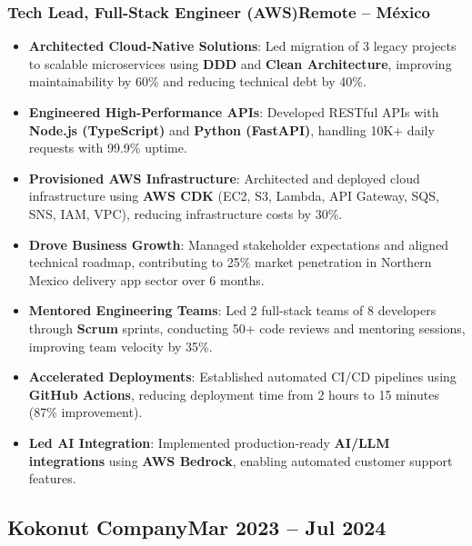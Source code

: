 \documentclass[a4paper,10pt]{article}
\newcommand{\kw}[1]{\textbf{\textcolor{keyword}{#1}}}
\newcommand{\tech}[1]{\textbf{\textcolor{tech}{#1}}}
\begin{document}
\subsubsection*{Tech Lead, Full-Stack Engineer (AWS)\hfill Remote -- México}
\begin{itemize}[noitemsep, leftmargin=*]
    \item \textbf{Architected Cloud-Native Solutions}: Led migration of 3 legacy projects to scalable microservices using \kw{DDD} and \kw{Clean Architecture}, improving maintainability by 60\% and reducing technical debt by 40\%.
    \item \textbf{Engineered High-Performance APIs}: Developed RESTful APIs with \tech{Node.js (TypeScript)} and \tech{Python (FastAPI)}, handling 10K+ daily requests with 99.9\% uptime.
    \item \textbf{Provisioned AWS Infrastructure}: Architected and deployed cloud infrastructure using \tech{AWS CDK} (EC2, S3, Lambda, API Gateway, SQS, SNS, IAM, VPC), reducing infrastructure costs by 30\%.
    \item \textbf{Drove Business Growth}: Managed stakeholder expectations and aligned technical roadmap, contributing to 25\% market penetration in Northern Mexico delivery app sector over 6 months.
    \item \textbf{Mentored Engineering Teams}: Led 2 full-stack teams of 8 developers through \kw{Scrum} sprints, conducting 50+ code reviews and mentoring sessions, improving team velocity by 35\%.
    \item \textbf{Accelerated Deployments}: Established automated CI/CD pipelines using \tech{GitHub Actions}, reducing deployment time from 2 hours to 15 minutes (87\% improvement).
    \item \textbf{Led AI Integration}: Implemented production-ready \kw{AI/LLM integrations} using \tech{AWS Bedrock}, enabling automated customer support features.
\end{itemize}

\subsection*{Kokonut Company\hfill\textbf{Mar 2023 -- Jul 2024}}
\end{document}
